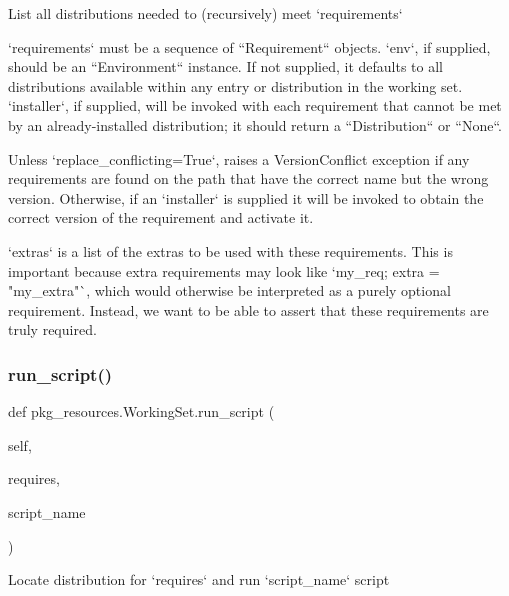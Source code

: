 \begin{DoxyVerb}List all distributions needed to (recursively) meet `requirements`

`requirements` must be a sequence of ``Requirement`` objects.  `env`,
if supplied, should be an ``Environment`` instance.  If
not supplied, it defaults to all distributions available within any
entry or distribution in the working set.  `installer`, if supplied,
will be invoked with each requirement that cannot be met by an
already-installed distribution; it should return a ``Distribution`` or
``None``.

Unless `replace_conflicting=True`, raises a VersionConflict exception
if
any requirements are found on the path that have the correct name but
the wrong version.  Otherwise, if an `installer` is supplied it will be
invoked to obtain the correct version of the requirement and activate
it.

`extras` is a list of the extras to be used with these requirements.
This is important because extra requirements may look like `my_req;
extra = "my_extra"`, which would otherwise be interpreted as a purely
optional requirement.  Instead, we want to be able to assert that these
requirements are truly required.
\end{DoxyVerb}
 \mbox{\label{classpkg__resources_1_1WorkingSet_ab2b93a4b8818042f319d7f9d7d2884bf}} 
\subsubsection{\texorpdfstring{run\+\_\+script()}{run\_script()}}
{\footnotesize\ttfamily def pkg\+\_\+resources.\+Working\+Set.\+run\+\_\+script (\begin{DoxyParamCaption}\item[{}]{self,  }\item[{}]{requires,  }\item[{}]{script\+\_\+name }\end{DoxyParamCaption})}

\begin{DoxyVerb}Locate distribution for `requires` and run `script_name` script\end{DoxyVerb}
 \mbox{\label{classpkg__resources_1_1WorkingSet_a998b3678540dc5f39aa560f347c66d4b}} 

